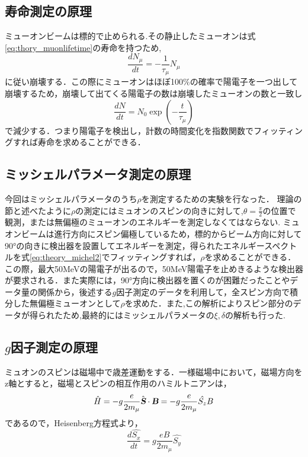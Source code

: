 \subsection{寿命測定の原理}
	ミューオンビームは標的で止められる.その静止したミューオンは式\eqref{eq:thory_muonlifetime}の寿命を持つため,
	\begin{equation}
		\frac{dN_\mu}{dt} = -\frac{1}{\tau_\mu} N_{\mu}
	\end{equation}
に従い崩壊する．この際にミューオンはほぼ100\%の確率で陽電子を一つ出して崩壊するため，崩壊して出てくる陽電子の数は崩壊したミューオンの数と一致し
	\begin{equation}
		\frac{dN}{dt} = N_0 \exp{\left(-\frac{t}{\tau_\mu}\right) }
	\end{equation}
で減少する．つまり陽電子を検出し，計数の時間変化を指数関数でフィッティングすれば寿命を求めることができる．
\subsection{ミッシェルパラメータ測定の原理}
	今回はミッシェルパラメータのうち$\rho$を測定するための実験を行なった．
        理論の節と述べたように$\rho$の測定にはミュオンのスピンの向きに対して,$\theta=\frac{\pi}{2}$の位置で観測，または無偏極のミューオンのエネルギーを測定しなくてはならない.
ミュオンビームは進行方向にスピン偏極しているため，標的からビーム方向に対して90°の向きに検出器を設置してエネルギーを測定，得られたエネルギースペクトルを式\eqref{eq:theory_michel2}でフィッティングすれば，$\rho$を求めることができる．この際，最大50MeVの陽電子が出るので，50MeV陽電子を止めきるような検出器が要求される．また実際には，90°方向に検出器を置くのが困難だったことやデータ量の関係から，後述する$g$因子測定のデータを利用して，全スピン方向で積分した無偏極ミューオンとして$\rho$を求めた．また,この解析によりスピン部分のデータが得られたため,最終的にはミッシェルパラメータの$\xi,\delta$の解析も行った.
\subsection{$g$因子測定の原理}
ミュオンのスピンは磁場中で歳差運動をする．一様磁場中において，磁場方向をz軸とすると，磁場とスピンの相互作用のハミルトニアンは，
\begin{equation}
\hat{H} = - g \frac{e}{2m_\mu} \hat {\textsl{\textbf {S}}} \cdot \textsl{\textbf {B}} = - g \frac{e}{2m_\mu}  \hat{S_z} B
\end{equation} 
であるので，Heisenberg方程式より，
\begin{equation}
\frac{d\hat{S_x}}{dt} =  g \frac{eB}{2m_\mu}\hat{S_y} 
\end{equation} 

